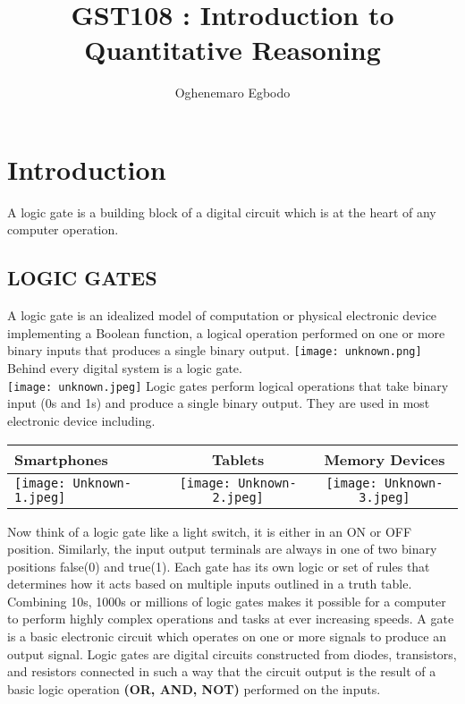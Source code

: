 \documentclass{article}
\begin{document}
 \title{GST108 : Introduction to Quantitative Reasoning}

\author{Oghenemaro Egbodo}
\maketitle
\newpage
\tableofcontents
\centering
\newpage


\section{Introduction}
A logic gate is a building block of a digital circuit which is at the heart of any computer operation.
\\
\subsection{LOGIC GATES}
A logic gate is an idealized model of computation or physical electronic device implementing a Boolean function, a logical operation performed on one or more binary inputs that produces a single binary output. 
\texttt{[image: unknown.png]}
\newpage
Behind every digital system is a logic gate.\\
\texttt{[image: unknown.jpeg]}
\newpage
Logic gates perform logical operations that take binary input (0s and 1s) and produce  a single binary output. They are used in most electronic device including.\\
\begin{table}[h!]
	\begin{center}
		\begin{tabular}{|l|c|c|}
			\hline
		 Smartphones & Tablets & Memory Devices\\
		 \hline
		 \texttt{[image: Unknown-1.jpeg]} & \texttt{[image: Unknown-2.jpeg]} & \texttt{[image: Unknown-3.jpeg]}\\
		 \hline
	\end{tabular}
\end{center}
\end{table}
\newpage
 Now think of a logic gate like a light switch, it is either in an ON or OFF position. Similarly, the input output terminals are always in one of two binary positions false(0) and true(1). Each gate has its own logic or set of rules that determines how it acts based on multiple inputs outlined in a truth table.
\newpage
Combining 10s, 1000s or millions of logic gates makes it possible for a computer to perform highly complex operations and tasks at ever increasing speeds.
\newpage
A gate is a basic electronic circuit which operates on one or more signals to produce an output signal. 
Logic gates are digital circuits constructed from diodes, transistors, and resistors connected in such a way that the circuit output is the result of a basic logic operation \textbf{(OR, AND, NOT)} performed on the inputs.
\newpage
\end{document}
